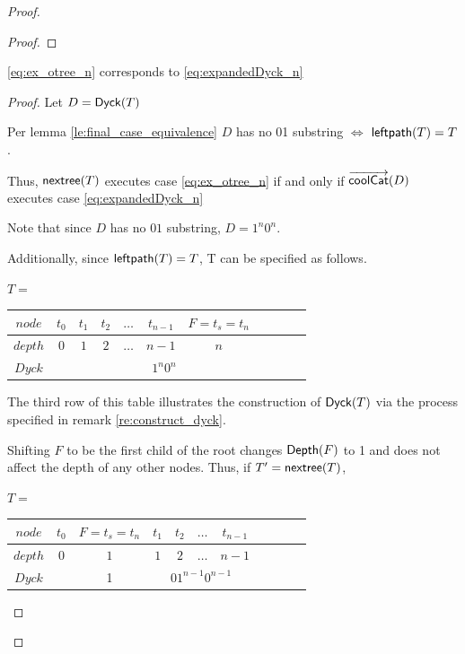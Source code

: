 \begin{proof}
\begin{proof}





\end{proof}
\begin{lemma}
    \ref{eq:ex_otree_n} corresponds to \ref{eq:expandedDyck_n}
\end{lemma}
\begin{proof}

    Let $D=\mathsf{Dyck}{(T)}$

    Per lemma \ref{le:final_case_equivalence} $D$ has no 01 substring $\iff$ $\mathsf{leftpath}{(T)}=T$.  

    Thus, $\mathsf{nextree}{(T)}$ executes case \ref{eq:ex_otree_n} if and only if $\overrightarrow{\mathsf{coolCat}}{(D)}$ executes case  \ref{eq:expandedDyck_n}

    Note that since $D$ has no $01$ substring, $D=1^n0^n$. 

    Additionally, since $\mathsf{leftpath}{(T)}=T$, T can be specified as follows.

    $T=$
    \begin{center}
	\begin{tabular}{ |c|c|c|c|c|c|c|c|c|c|c| } 
	    \hline

	    $node$ & $t_0$ & $t_1$  & $t_2$ & $\dots$ & $t_{n-1}$&$F=t_s=t_n$  \\
	    \hline
	    $depth$ & $0$ & $1$ & $2$ & $\dots$ & $n-1$ & $n$ \\
	    \hline
	    $Dyck$ &  &  \multicolumn{5}{|c|}{$1^n0^n$} \\
	    \hline
	\end{tabular}
    \end{center}

    The third row of this table illustrates the construction of $\mathsf{Dyck}{(T)}$ via the process specified in remark \ref{re:construct_dyck}.

    Shifting $F$ to be the first child of the root changes $\mathsf{Depth}{(F)}$ to 1 and does not affect the depth of any other nodes.  Thus, if $T'=\mathsf{nextree}{(T)}$, 


    $T=$
    \begin{center}
	\begin{tabular}{ |c|c|c|c|c|c|c|c|c|c|c| } 
	    \hline

	    $node$ & $t_0$ & $F=t_s=t_n$ & $t_1$  & $t_2$ & $\dots$ & $t_{n-1}$  \\
	    \hline
	    $depth$ & $0$ & $1$ & $1$ & $2$ & $\dots$ & $n-1$ \\
	    \hline
	    $Dyck$ &  &  1 &  \multicolumn{4}{|c|}{$01^{n-1}0^{n-1}$} \\
	    \hline
	\end{tabular}
    \end{center}


\end{proof}
\end{proof}

